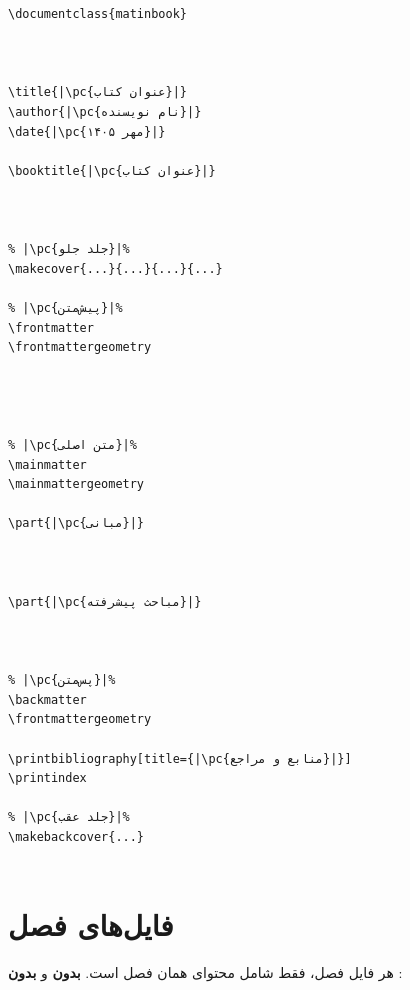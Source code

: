 \begin{latin}
\begin{verbatim}
\documentclass{matinbook}



\title{|\pc{عنوان کتاب}|}
\author{|\pc{نام نویسنده}|}
\date{|\pc{مهر ۱۴۰۵}|}

\booktitle{|\pc{عنوان کتاب}|}



% |\pc{جلد جلو}|%
\makecover{...}{...}{...}{...}

% |\pc{پیش‌متن}|%
\frontmatter
\frontmattergeometry




% |\pc{متن اصلی}|%
\mainmatter
\mainmattergeometry

\part{|\pc{مبانی}|}



\part{|\pc{مباحث پیشرفته}|}



% |\pc{پس‌متن}|%
\backmatter
\frontmattergeometry

\printbibliography[title={|\pc{منابع و مراجع}|}]
\printindex

% |\pc{جلد عقب}|%
\makebackcover{...}


\end{verbatim}
\end{latin}


\section{فایل‌های فصل}
\label{sec:large-projects-chapters}

هر فایل فصل، فقط شامل محتوای همان فصل
است. \textbf{بدون}  و
\textbf{بدون} :

